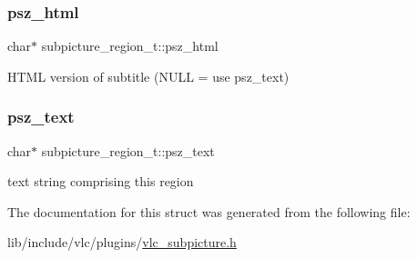 \subsubsection{\texorpdfstring{psz\+\_\+html}{psz\_html}}
{\footnotesize\ttfamily char$\ast$ subpicture\+\_\+region\+\_\+t\+::psz\+\_\+html}

H\+T\+ML version of subtitle (N\+U\+LL = use psz\+\_\+text) \mbox{\label{structsubpicture__region__t_af1e658d75fc6d2bab50687cdc118f6b3}} 
\subsubsection{\texorpdfstring{psz\+\_\+text}{psz\_text}}
{\footnotesize\ttfamily char$\ast$ subpicture\+\_\+region\+\_\+t\+::psz\+\_\+text}

text string comprising this region 

The documentation for this struct was generated from the following file\+:\begin{DoxyCompactItemize}
\item 
lib/include/vlc/plugins/\hyperlink{vlc__subpicture_8h}{vlc\+\_\+subpicture.\+h}\end{DoxyCompactItemize}
